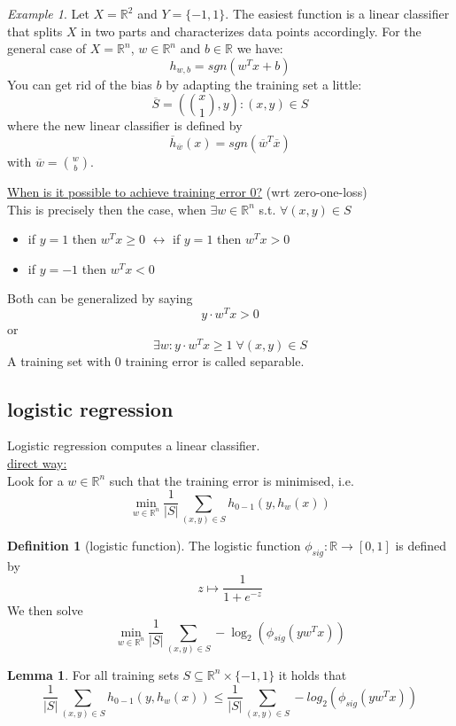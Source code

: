 \documentclass[a4paper, 12pt]{article}
\theoremstyle{plain}
\theoremstyle{definition}
\newtheorem{definition}[theorem]{Definition} %
\theoremstyle{lemma}
\newtheorem{lemma}[theorem]{Lemma}
\theoremstyle{remark}
\theoremstyle{example}
\newtheorem{example}[theorem]{Example}
\begin{document}
	\begin{example}
		Let $X = \mathbb{R}^2$ and $Y = \{-1,1\}$. The easiest function is a linear classifier that splits $X$ in two parts and characterizes data points accordingly. For the general case of $X = \mathbb{R}^n$, $w \in \mathbb{R}^n$ and $b \in \mathbb{R}$ we have:
		\[h_{w,b} = sgn(w^Tx + b)\] 
		You can get rid of the bias $b$ by adapting the training set a little: \[\overline{S} = (\binom{x}{1},y): (x,y) \in S\]
		where the new linear classifier is defined by \[\overline{h}_{\overline{w}}(x) = sgn(\overline{w}^T\overline{x})\] with $\overline{w} = \binom{w}{b}$.
	\end{example}
	\noindent\underline{When is it possible to achieve training error 0?} (wrt zero-one-loss)\\
	This is precisely then the case, when $\exists w \in \mathbb{R}^n$ s.t. $\forall (x,y) \in S$ \begin{itemize}
		\item if $y = 1$ then $w^Tx \geq 0$ $\leftrightarrow$ if $y = 1$ then $w^Tx > 0$
		\item if $y = -1$ then $w^Tx < 0$
	\end{itemize} 
	Both can be generalized by saying \[y\cdot w^Tx > 0\]
	or \[\exists w: y \cdot w^Tx \geq 1 \; \forall (x,y) \in S\] 
	A training set with 0 training error is called separable.
	
	\subsection{logistic regression}
	Logistic regression computes a linear classifier.\\
	\underline{direct way:}\\
	Look for a $w \in \mathbb{R}^n$ such that the training error is minimised, i.e. \[\min\limits_{w \in \mathbb{R}^n} \frac{1}{\left|S\right|} \sum_{(x,y) \in S} h_{0-1}(y,h_w(x))\]
	
	\begin{definition}[logistic function]
		The logistic function $\phi_{sig}: \mathbb{R} \to [0,1]$ is defined by \[z \mapsto \frac{1}{1+e^{-z}}\]
		We then solve \[\min\limits_{w \in \mathbb{R}^n} \frac{1}{\left|S\right|} \sum_{(x,y) \in S} - \log_2(\phi_{sig}(yw^Tx))\]
	\end{definition}
	
	\begin{lemma}
		For all training sets $S \subseteq \mathbb{R}^n \times \{-1,1\}$ it holds that \[\frac{1}{\left|S\right|} \sum_{(x,y) \in S} h_{0-1}(y,h_w(x)) \leq \frac{1}{\left|S\right|} \sum_{(x,y) \in S} -log_2(\phi_{sig}(yw^Tx))\]
	\end{lemma}
\end{document}
